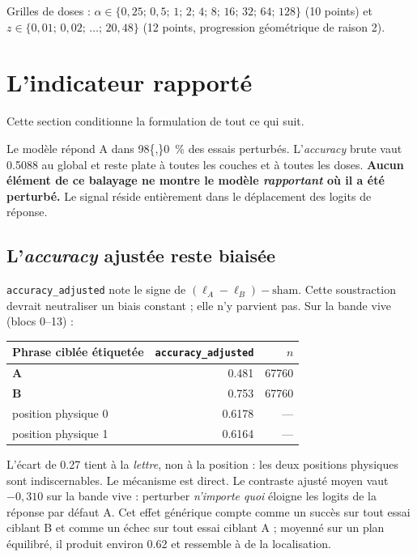 \documentclass[11pt,a4paper]{article}
\newcommand{\code}[1]{\texttt{\small #1}}
\begin{document}
Grilles de doses : $\alpha \in \{0{,}25;\,0{,}5;\,1;\,2;\,4;\,8;\,16;\,32;\,64;\,128\}$
(10 points) et $z \in \{0{,}01;\,0{,}02;\,\dots;\,20{,}48\}$ (12 points, progression
géométrique de raison 2).

\section{L'indicateur rapporté}
\label{sec:indicateur}

Cette section conditionne la formulation de tout ce qui suit.

Le modèle répond \og A \fg{} dans \SI{98{,}0}{\percent} des essais perturbés.
L'\emph{accuracy} brute vaut \num{0.5088} au global et reste plate à toutes les couches
et à toutes les doses. \textbf{Aucun élément de ce balayage ne montre le modèle
\emph{rapportant} où il a été perturbé.} Le signal réside entièrement dans le
déplacement des logits de réponse.

\subsection{L'\emph{accuracy} ajustée reste biaisée}

\code{accuracy\_adjusted} note le signe de $(\ell_A - \ell_B) - \text{sham}$. Cette
soustraction devrait neutraliser un biais constant ; elle n'y parvient pas. Sur la bande
vive (blocs 0--13) :

\begin{center}
\begin{tabular}{lrr}
\toprule
Phrase ciblée étiquetée & \code{accuracy\_adjusted} & $n$ \\
\midrule
\textbf{A} & \num{0.481} & \num{67760} \\
\textbf{B} & \num{0.753} & \num{67760} \\
\midrule
position physique 0 & \num{0.6178} & --- \\
position physique 1 & \num{0.6164} & --- \\
\bottomrule
\end{tabular}
\end{center}

\noindent
L'écart de \num{0.27} tient à la \emph{lettre}, non à la position : les deux positions
physiques sont indiscernables. Le mécanisme est direct. Le contraste ajusté moyen vaut
$-0{,}310$ sur la bande vive : perturber \emph{n'importe quoi} éloigne les logits de la
réponse par défaut A. Cet effet générique compte comme un succès sur tout essai ciblant B
et comme un échec sur tout essai ciblant A ; moyenné sur un plan équilibré, il produit
environ \num{0.62} et ressemble à de la localisation.
\end{document}
